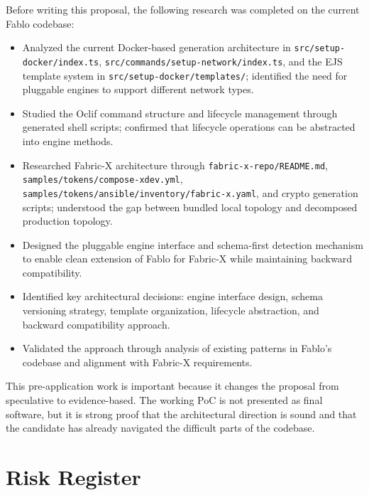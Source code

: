 \begin{tcolorbox}[colback=green!5!white, colframe=green!60!black,
  title=Pre-Application Research Completed, fonttitle=\bfseries, arc=4pt]
Before writing this proposal, the following research was completed on the current Fablo codebase:
\begin{itemize}[leftmargin=*]
  \item Analyzed the current Docker-based generation architecture in \texttt{src/setup-docker/index.ts}, \texttt{src/commands/setup-network/index.ts}, and the EJS template system in \texttt{src/setup-docker/templates/}; identified the need for pluggable engines to support different network types.
  \item Studied the Oclif command structure and lifecycle management through generated shell scripts; confirmed that lifecycle operations can be abstracted into engine methods.
  \item Researched Fabric-X architecture through \texttt{fabric-x-repo/README.md}, \texttt{samples/tokens/compose-xdev.yml}, \texttt{samples/tokens/ansible/inventory/fabric-x.yaml}, and crypto generation scripts; understood the gap between bundled local topology and decomposed production topology.
  \item Designed the pluggable engine interface and schema-first detection mechanism to enable clean extension of Fablo for Fabric-X while maintaining backward compatibility.
  \item Identified key architectural decisions: engine interface design, schema versioning strategy, template organization, lifecycle abstraction, and backward compatibility approach.
  \item Validated the approach through analysis of existing patterns in Fablo's codebase and alignment with Fabric-X requirements.
\end{itemize}
\end{tcolorbox}

This pre-application work is important because it changes the proposal from speculative to evidence-based. The working PoC is not presented as final software, but it is strong proof that the architectural direction is sound and that the candidate has already navigated the difficult parts of the codebase.
\section{Risk Register}

